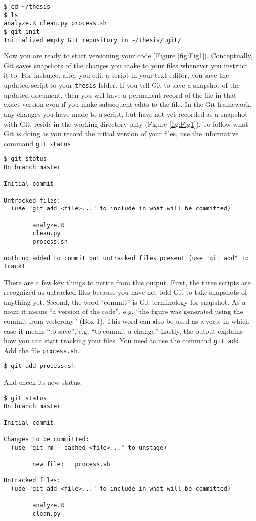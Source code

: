 \begin{verbatim}
$ cd ~/thesis
$ ls
analyze.R clean.py process.sh
$ git init
Initialized empty Git repository in ~/thesis/.git/
\end{verbatim}

Now you are ready to start versioning your code (Figure \ref{fig:Fig1}).
Conceptually, Git saves snapshots of the changes you make to your files whenever you instruct it to.
For instance, after you edit a script in your text editor, you save the updated script to your \verb|thesis| folder.
If you tell Git to save a shapshot of the updated document, then you will have a permanent record of the file in that exact version even if you make subsequent edits to the file.
In the Git framework, any changes you have made to a script, but have not yet recorded as a snapshot with Git, reside in the working directory only (Figure \ref{fig:Fig1}).
To follow what Git is doing as you record the initial version of your files, use the informative command \verb|git status|.

\begin{verbatim}
$ git status
On branch master

Initial commit

Untracked files:
  (use "git add <file>..." to include in what will be committed)

        analyze.R
        clean.py
        process.sh

nothing added to commit but untracked files present (use "git add" to track)
\end{verbatim}

There are a few key things to notice from this output.
First, the three scripts are recognized as untracked files because you have not told Git to take snapshots of anything yet.
Second, the word ``commit'' is Git terminology for snapshot.
As a noun it means ``a version of the code'', e.g. ``the figure was generated using the commit from yesterday'' (Box 1).
This word can also be used as a verb, in which case it means ``to save'', e.g. ``to commit a change.''
Lastly, the output explains how you can start tracking your files.
You need to use the command \verb|git add|.
Add the file \verb|process.sh|.

\begin{verbatim}
$ git add process.sh
\end{verbatim}

And check its new status.

\begin{verbatim}
$ git status
On branch master

Initial commit

Changes to be committed:
  (use "git rm --cached <file>..." to unstage)

        new file:   process.sh

Untracked files:
  (use "git add <file>..." to include in what will be committed)

        analyze.R
        clean.py
\end{verbatim}

